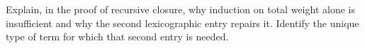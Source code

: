 \begin{exercise}\label{ex:c-closure-6}
Explain, in the proof of recursive closure, why induction on total
weight alone is insufficient and why the second lexicographic entry
repairs it. Identify the unique type of term for which that second
entry is needed.

\par\smallskip{}\par
\end{exercise}

